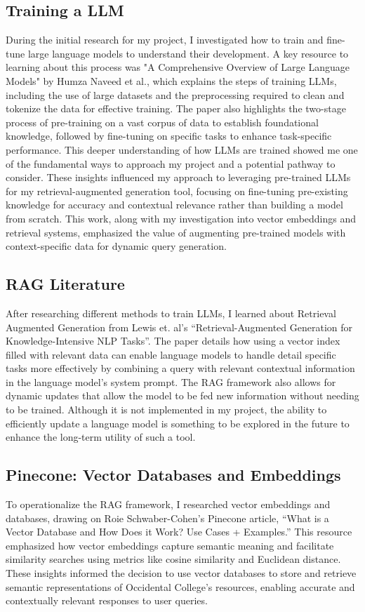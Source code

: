 \documentclass[10pt,twocolumn]{article}
\begin{document}
\subsection{Training a LLM}
During the initial research for my project, I investigated how to train and fine-tune large language models to understand their development. A key resource to learning about this process was "A Comprehensive Overview of Large Language Models" by Humza Naveed et al.\cite{naveed2024comprehensiveoverviewlargelanguage}, which explains the steps of training LLMs, including the use of large datasets and the preprocessing required to clean and tokenize the data for effective training. The paper also highlights the two-stage process of pre-training on a vast corpus of data to establish foundational knowledge, followed by fine-tuning on specific tasks to enhance task-specific performance. This deeper understanding of how LLMs are trained showed me one of the fundamental ways to approach my project and a potential pathway to consider. These insights influenced my approach to leveraging pre-trained LLMs for my retrieval-augmented generation tool, focusing on fine-tuning pre-existing knowledge for accuracy and contextual relevance rather than building a model from scratch. This work, along with my investigation into vector embeddings and retrieval systems, emphasized the value of augmenting pre-trained models with context-specific data for dynamic query generation.

\subsection{RAG Literature}
After researching different methods to train LLMs, I learned about Retrieval Augmented Generation from Lewis et. al’s “Retrieval-Augmented Generation for Knowledge-Intensive NLP Tasks”.\cite{arxiv_2005_11401} The paper details how using a vector index filled with relevant data can enable language models to handle detail specific tasks more effectively by combining a query with relevant contextual information in the language model’s system prompt. The RAG framework also allows for dynamic updates that allow the model to be fed new information without needing to be trained. Although it is not implemented in my project, the ability to  efficiently update a language model is something to be explored in the future to enhance the long-term utility of such a tool. 
\vspace{25pt}
\subsection{Pinecone: Vector Databases and Embeddings}
To operationalize the RAG framework, I researched vector embeddings and databases, drawing on Roie Schwaber-Cohen’s Pinecone article, “What is a Vector Database and How Does it Work? Use Cases + Examples.”\cite{pinecone_vector_database} This resource emphasized how vector embeddings capture semantic meaning and facilitate similarity searches using metrics like cosine similarity and Euclidean distance. These insights informed the decision to use vector databases to store and retrieve semantic representations of Occidental College’s resources, enabling accurate and contextually relevant responses to user queries.
\end{document}
